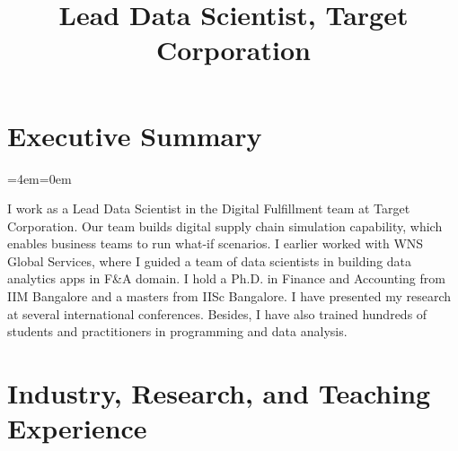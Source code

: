 \documentclass[11pt,a4paper,]{moderncv}
\title{Lead Data Scientist, Target Corporation}
\begin{document}
\makecvtitle



\newenvironment{smallblockquote}{%
  \par%
  \medskip
  \leftskip=2em\rightskip=0em%
  \noindent\ignorespaces}{%
  \par\medskip}

\newenvironment{blockquote}{%
  \par%
  \medskip
  \leftskip=4em\rightskip=0em%
  \noindent\ignorespaces}{%
  \par\medskip}

\hypertarget{executive-summary}{%
\section{Executive Summary}\label{executive-summary}}

\begingroup
\bgroup %
  \par%
  \medskip
  \leftskip=4em\rightskip=0em%
  \noindent\ignorespaces

I work as a Lead Data Scientist in the Digital Fulfillment team at Target Corporation. Our team builds digital supply chain simulation capability, which enables business teams to run what-if scenarios. I earlier worked with WNS Global Services, where I guided a team of data scientists in building data analytics apps in F\&A domain. I hold a Ph.D. in Finance and Accounting from IIM Bangalore and a masters from IISc Bangalore. I have presented my research at several international conferences. Besides, I have also trained hundreds of students and practitioners in programming and data analysis.

%
  \par\medskip\egroup 
\endgroup

\hypertarget{industry-research-and-teaching-experience}{%
\section{Industry, Research, and Teaching
Experience}\label{industry-research-and-teaching-experience}}
\end{document}
